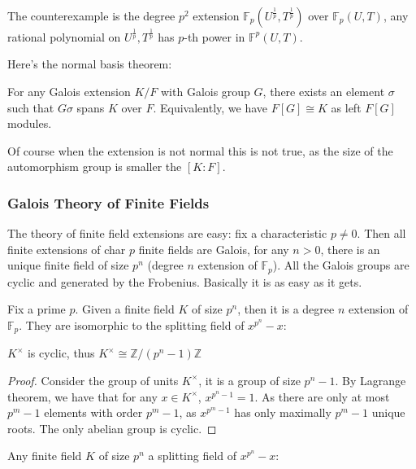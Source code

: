 \documentclass[main.tex]{subfiles}
\begin{document}
\begin{remark}
The counterexample is the degree $p^2$ extension $\mathbb{F}_p(U^\frac{1}{p}, T^\frac{1}{p})$ over $\mathbb{F}_p(U,T)$, any rational polynomial on $U^\frac{1}{p}, T^\frac{1}{p}$ has $p$-th power in $\mathbb{F}^p(U,T)$.
\end{remark}

Here's the normal basis theorem:
\begin{theorem}
For any Galois extension $K/F$ with Galois group $G$, there exists an element $\sigma$ such that $G \sigma$ spans $K$ over $F$. Equivalently, we have $F[G] \cong K$ as left $F[G]$ modules. 
\end{theorem}

\begin{remark}
Of course when the extension is not normal this is not true, as the size of the automorphism group is smaller the $[K:F]$.
\end{remark}

\subsubsection{Galois Theory of Finite Fields}

The theory of finite field extensions are easy: fix a characteristic $p \neq 0$. Then all finite extensions of char $p$ finite fields are Galois, for any $n > 0$, there is an unique finite field of size $p^n$ (degree $n$ extension of $\mathbb{F}_p$). All the Galois groups are cyclic and generated by the Frobenius. Basically it is as easy as it gets.

Fix a prime $p$. Given a finite field $K$ of size $p^n$, then it is a degree $n$ extension of $\mathbb{F}_p$. They are isomorphic to the splitting field of $x^{p^n} - x$:

\begin{lemma}
$K^\times$ is cyclic, thus $K^\times \cong \mathbb{Z}/(p^n - 1)\mathbb{Z} $
\end{lemma}

\begin{proof}
Consider the group of units $K^\times$, it is a group of size $p^n -1$. By Lagrange theorem, we have that for any $x \in K^\times$, $x^{p^n -1} = 1$. As there are only at most $p^m-1$ elements with order $p^m-1$, as $x^{p^m -1}$ has only maximally $p^m -1$ unique roots. The only abelian group is cyclic.
\end{proof}


\begin{lemma}
Any finite field $K$ of size $p^n$ a splitting field of $x^{p^n} -x$:
\end{lemma}
\end{document}
